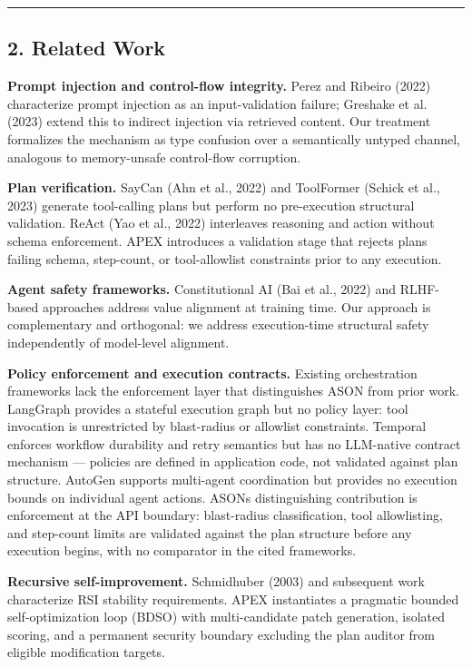 \documentclass[
]{article}
\begin{document}
\begin{center}\rule{0.5\linewidth}{0.5pt}\end{center}

\subsection{2. Related Work}\label{2-related-work}

\textbf{Prompt injection and control-flow integrity.} Perez and Ribeiro
(2022) characterize prompt injection as an input-validation failure;
Greshake et al. (2023) extend this to indirect injection via retrieved
content. Our treatment formalizes the mechanism as type confusion over a
semantically untyped channel, analogous to memory-unsafe control-flow
corruption.

\textbf{Plan verification.} SayCan (Ahn et al., 2022) and ToolFormer
(Schick et al., 2023) generate tool-calling plans but perform no
pre-execution structural validation. ReAct (Yao et al., 2022)
interleaves reasoning and action without schema enforcement. APEX
introduces a validation stage that rejects plans failing schema,
step-count, or tool-allowlist constraints prior to any execution.

\textbf{Agent safety frameworks.} Constitutional AI (Bai et al., 2022)
and RLHF-based approaches address value alignment at training time. Our
approach is complementary and orthogonal: we address execution-time
structural safety independently of model-level alignment.

\textbf{Policy enforcement and execution contracts.} Existing
orchestration frameworks lack the enforcement layer that distinguishes
ASON from prior work. LangGraph provides a stateful execution graph but
no policy layer: tool invocation is unrestricted by blast-radius or
allowlist constraints. Temporal enforces workflow durability and retry
semantics but has no LLM-native contract mechanism --- policies are
defined in application code, not validated against plan structure.
AutoGen supports multi-agent coordination but provides no execution
bounds on individual agent actions. ASON\textquotesingle s
distinguishing contribution is enforcement at the API boundary:
blast-radius classification, tool allowlisting, and step-count limits
are validated against the plan structure before any execution begins,
with no comparator in the cited frameworks.

\textbf{Recursive self-improvement.} Schmidhuber (2003) and subsequent
work characterize RSI stability requirements. APEX instantiates a
pragmatic bounded self-optimization loop (BDSO) with multi-candidate
patch generation, isolated scoring, and a permanent security boundary
excluding the plan auditor from eligible modification targets.
\end{document}
